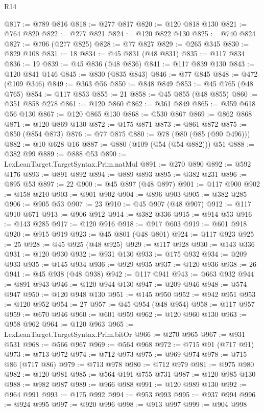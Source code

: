 \begin{lexlean}{R14}
\begin{coremodule}
{{{{{{{{{{{{{{{{{{{{{{{{{{{{{{{{{{{{{{{{{{{{{{{{{{{{{{{{{{{{{{{{{{{{{{{{{{{{{{{{{{{{{{{{{{{{{{{{{{{{{{{{{{@817 := @789 @816
@818 := @277 @817
@820 := @120 @818 @130
@821 := @764 @820
@822 := @277 @821
@824 := @120 @822 @130
@825 := @740 @824
@827 := @706 (@277 @825)
@828 := @77 @827
@829 := @265 @345
@830 := @829 @108
@831 := 18
@834 := @45 @831 (@48 @831)
@835 := @117 @834
@836 := 19
@839 := @45 @836 (@48 @836)
@841 := @117 @839 @130
@843 := @120 @841 @146
@845 := @830 (@835 @843)
@846 := @77 @845
@848 := @472 (@109 @346)
@849 := @363 @56
@850 := @848 @849
@853 := @45 @765 (@48 @765)
@854 := @117 @853
@855 := 21
@858 := @45 @855 (@48 @855)
@860 := @351 @858 @278
@861 := @120 @860
@862 := @361 @849
@865 := @359 @618 @56 @130
@867 := @120 @865 @130
@868 := @530 @867
@869 := @862 @868
@871 := @120 @869 @130
@872 := @175 @871
@873 := @861 @872
@875 := @850 (@854 @873)
@876 := @77 @875
@880 := @78 (@80 (@85 (@90 @496)))
@882 := @10 @628 @16
@887 := @880 (@109 (@54 (@54 @882))) @51
@888 := @382 @99
@889 := @888 @53
@890 := LexLeanTarget.TargetSyntax.Prim.natMul
@891 := @270 @890
@892 := @592 @176
@893 := @891 @892
@894 := @889 @893
@895 := @382 @231
@896 := @895 @53
@897 := 22
@900 := @45 @897 (@48 @897)
@901 := @117 @900
@902 := @158 @210
@903 := @901 @902
@904 := @896 @903
@905 := @382 @285
@906 := @905 @53
@907 := 23
@910 := @45 @907 (@48 @907)
@912 := @117 @910 @671
@913 := @906 @912
@914 := @382 @336
@915 := @914 @53
@916 := @143 @285
@917 := @120 @916
@918 := @917 @603
@919 := @601 @918
@920 := @915 @919
@923 := @45 @801 (@48 @801)
@924 := @117 @923
@925 := 25
@928 := @45 @925 (@48 @925)
@929 := @117 @928
@930 := @143 @336
@931 := @120 @930
@932 := @931 @130
@933 := @175 @932
@934 := @209 @933
@935 := @145 @934
@936 := @929 @935
@937 := @120 @936
@938 := 26
@941 := @45 @938 (@48 @938)
@942 := @117 @941
@943 := @663 @932
@944 := @891 @943
@946 := @120 @944 @130
@947 := @209 @946
@948 := @574 @947
@950 := @120 @948 @130
@951 := @145 @950
@952 := @942 @951
@953 := @120 @952
@954 := 27
@957 := @45 @954 (@48 @954)
@958 := @117 @957
@959 := @670 @946
@960 := @601 @959
@962 := @120 @960 @130
@963 := @958 @962
@964 := @120 @963
@965 := LexLeanTarget.TargetSyntax.Prim.bitOr
@966 := @270 @965
@967 := @931 @531
@968 := @566 @967
@969 := @564 @968
@972 := @715 @91 (@717 @91)
@973 := @713 @972
@974 := @712 @973
@975 := @969 @974
@978 := @715 @86 (@717 @86)
@979 := @713 @978
@980 := @712 @979
@981 := @975 @980
@982 := @120 @981
@985 := @564 @191 @755 @731
@987 := @120 @985 @130
@988 := @982 @987
@989 := @966 @988
@991 := @120 @989 @130
@992 := @964 @991
@993 := @175 @992
@994 := @953 @993
@995 := @937 @994
@996 := @924 @995
@997 := @920 @996
@998 := @913 @997
@999 := @904 @998
}}}}}}}}}}}}}}}}}}}}}}}}}}}}}}}}}}}}}}}}}}}}}}}}}}}}}}}}}}}}}}}}}}}}}}}}}}}}}}}}}}}}}}}}}}}}}}}}}}}}}}}}}}
\end{coremodule}
\end{lexlean}
